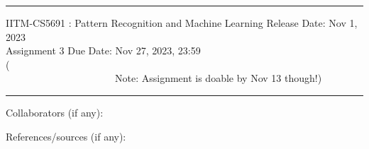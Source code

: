 \documentclass[solution,addpoints,12pt]{exam}
\begin{document}
\hrule
\vspace{3mm}
\noindent 
{\sf IITM-CS5691 : Pattern Recognition and Machine Learning  \hfill Release Date: Nov 1, 2023}
\\
\noindent 
{\sf Assignment 3 \hfill Due Date: Nov 27, 2023, 23:59\\(~~~~~~~~~~~~~~~~~~~~~~~~~~~~~~~~~~~~~~~~~~~~~~~~~~~~~~~~~~~~~~~~~~~~~~~~~~~~~~~~~~~~~~~~~~~~~Note: Assignment is doable by Nov 13 though!)}
\vspace{3mm}
\hrule
\vspace{3mm}

\noindent
{{\sf Collaborators (if any): }} %

\noindent
{{\sf References/sources (if any): 
}} %
\end{document}
